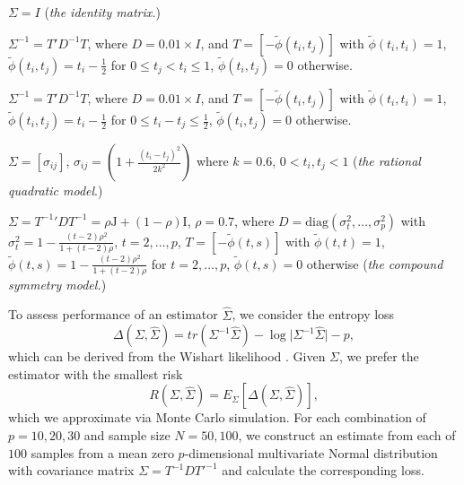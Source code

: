 \documentclass[12pt]{article}
\begin{document}
\begin{description}[style=multiline, leftmargin=3cm, font=\normalfont]
\item[\textit{Model I:} ] $\Sigma = I$ (\textit{the identity matrix.})
\item[\textit{Model II:} ] $\Sigma^{-1} = T' D^{-1} T$, where $D = 0.01 \times I$, and $T = \left[-\tilde{\phi}\left(t_i, t_j\right)\right]$ with $\tilde{\phi}\left(t_i,t_i\right) = 1$,
							 $\tilde{\phi}\left(t_i,t_j\right) = t_i - \frac{1}{2}$ for $0 \le t_j < t_i \le 1$, $\tilde{\phi}\left(t_i,t_j\right) = 0$ otherwise.
\item[\textit{Model III:} ] $\Sigma^{-1} = T' D^{-1} T$, where $D = 0.01 \times I$, and $T = \left[-\tilde{\phi}\left(t_i, t_j\right)\right]$ with $\tilde{\phi}\left(t_i,t_i\right) = 1$,
							 $\tilde{\phi}\left(t_i,t_j\right) = t_i - \frac{1}{2}$ for $0 \le t_i - t_j \le \frac{1}{2}$, $\tilde{\phi}\left(t_i,t_j\right) = 0$ otherwise.
\item[\textit{Model IV:} ] $\Sigma = \left[\sigma_{ij}\right]$, $\sigma_{ij} = \left(1 + \frac{\left(t_i - t_j\right)^2}{2 k^2}\right)$ where $k = 0.6$, $0 < t_i, t_j < 1$ (\textit{the rational quadratic model}.)
\item[\textit{Model V:} ] $\Sigma = {T^{-1}}' D T^{-1} = \rho \mathrm{J} + \left(1-\rho\right)\mathrm{I}$, $\rho = 0.7$, where $D = \mbox{diag}\left(\sigma_t^2,\dots, \sigma_p^2\right)$ with $\sigma_t^2 = 1 -\frac{\left(t-2\right)\rho^2}{1 + \left(t-2\right)\rho}$, $t = 2,\dots, p$, $T = \left[-\tilde{\phi}\left(t, s\right)\right]$ with $\tilde{\phi}\left(t,t\right) = 1$, $\tilde{\phi}\left(t,s\right) = 1 -\frac{\left(t-2\right)\rho^2}{1 + \left(t-2\right)\rho}$ for $t = 2, \dots, p$, $\tilde{\phi}\left(t,s\right) = 0$ otherwise (\textit{the compound symmetry model.}) 
\end{description} %

To assess performance of an estimator $\hat{\Sigma}$, we consider the entropy loss
\begin{equation*} \label{eq:quad-loss}
\Delta\left(\Sigma,\hat{\Sigma}\right) = tr\left( \Sigma^{-1} \hat{\Sigma} \right) - \log \vert \Sigma^{-1} \hat{\Sigma} \vert - p,
\end{equation*}
\noindent
which can be derived from the Wishart likelihood \cite{Anderson84a}. Given $\Sigma$, we prefer the estimator with the smallest risk
\begin{equation*}
R \left(\Sigma,\hat{\Sigma}\right) = E_\Sigma\left[\Delta\left(\Sigma,\hat{\Sigma}\right)\right], 
\end{equation*}
\noindent
which we approximate via Monte Carlo simulation. For each combination of $p = 10, 20, 30$ and sample size $N = 50, 100$, we construct an estimate from each of $100$ samples from a mean zero $p$-dimensional multivariate Normal distribution with covariance matrix $\Sigma = T^{-1} D {T'}^{-1}$ and calculate the corresponding loss. 
\end{document}
